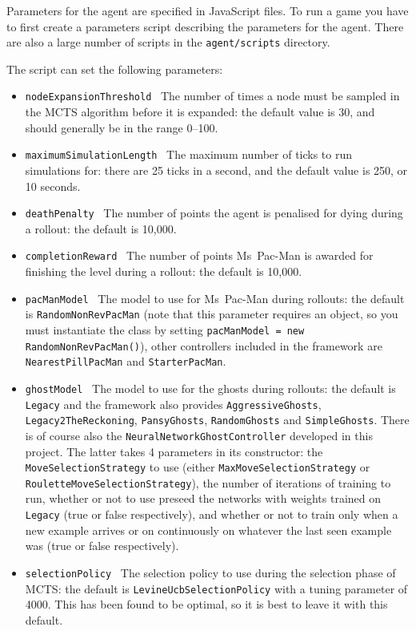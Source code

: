 Parameters for the agent are specified in JavaScript files.  To run a game you have to first create a parameters script describing the parameters for the agent.  There are also a large number of scripts in the {\tt agent/scripts} directory.

The script can set the following parameters:

\begin{itemize}
\item {\tt nodeExpansionThreshold} ~The number of times a node must be sampled in the MCTS algorithm before it is expanded: the default value is 30, and should generally be in the range 0--100.
\item {\tt maximumSimulationLength} ~The maximum number of ticks to run simulations for: there are 25 ticks in a second, and the default value is 250, or 10 seconds.
\item {\tt deathPenalty} ~The number of points the agent is penalised for dying during a rollout: the default is 10,000.
\item {\tt completionReward} ~The number of points Ms~Pac-Man is awarded for finishing the level during a rollout: the default is 10,000.
\item {\tt pacManModel} ~The model to use for Ms~Pac-Man during rollouts: the default is {\tt RandomNonRevPacMan} (note that this parameter requires an object, so you must instantiate the class by setting {\tt pacManModel = new RandomNonRevPacMan()}), other controllers included in the framework are {\tt NearestPillPacMan} and {\tt StarterPacMan}.
\item {\tt ghostModel} ~The model to use for the ghosts during rollouts: the default is {\tt Legacy} and the framework also provides {\tt AggressiveGhosts}, {\tt Legacy2TheReckoning}, {\tt PansyGhosts}, {\tt RandomGhosts} and {\tt SimpleGhosts}.  There is of course also the {\tt NeuralNetworkGhostController} developed in this project.  The latter takes 4 parameters in its constructor: the {\tt MoveSelectionStrategy} to use (either {\tt MaxMoveSelectionStrategy} or {\tt RouletteMoveSelectionStrategy}), the number of iterations of training to run, whether or not to use preseed the networks with weights trained on {\tt Legacy} (true or false respectively), and whether or not to train only when a new example arrives or on continuously on whatever the last seen example was (true or false respectively).
\item {\tt selectionPolicy} ~The selection policy to use during the selection phase of MCTS: the default is {\tt LevineUcbSelectionPolicy} with a tuning parameter of 4000.  This has been found to be optimal, so it is best to leave it with this default.

\end{itemize}

